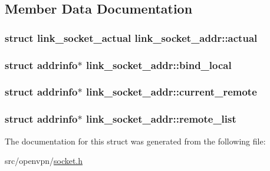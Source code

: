 \subsection{Member Data Documentation}
\hypertarget{structlink__socket__addr_a31cf151a4d7544429e7740cbda55193c}{}
\subsubsection[{actual}]{\setlength{\rightskip}{0pt plus 5cm}struct {\bf link\+\_\+socket\+\_\+actual} link\+\_\+socket\+\_\+addr\+::actual}\label{structlink__socket__addr_a31cf151a4d7544429e7740cbda55193c}
\hypertarget{structlink__socket__addr_a5a4d9686ebf0ef5a00117de888ac78cf}{}
\subsubsection[{bind\+\_\+local}]{\setlength{\rightskip}{0pt plus 5cm}struct addrinfo$\ast$ link\+\_\+socket\+\_\+addr\+::bind\+\_\+local}\label{structlink__socket__addr_a5a4d9686ebf0ef5a00117de888ac78cf}
\hypertarget{structlink__socket__addr_a86eeebfb3c5eee93573fa9b577b12f7a}{}
\subsubsection[{current\+\_\+remote}]{\setlength{\rightskip}{0pt plus 5cm}struct addrinfo$\ast$ link\+\_\+socket\+\_\+addr\+::current\+\_\+remote}\label{structlink__socket__addr_a86eeebfb3c5eee93573fa9b577b12f7a}
\hypertarget{structlink__socket__addr_a4eb1c90dc35a5fcd2952072cbe8f6c83}{}
\subsubsection[{remote\+\_\+list}]{\setlength{\rightskip}{0pt plus 5cm}struct addrinfo$\ast$ link\+\_\+socket\+\_\+addr\+::remote\+\_\+list}\label{structlink__socket__addr_a4eb1c90dc35a5fcd2952072cbe8f6c83}


The documentation for this struct was generated from the following file\+:\begin{DoxyCompactItemize}
\item 
src/openvpn/\hyperlink{socket_8h}{socket.\+h}\end{DoxyCompactItemize}
